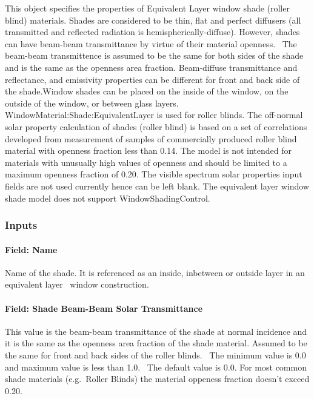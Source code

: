 This object specifies the properties of Equivalent Layer window shade (roller blind) materials. Shades are considered to be thin, flat and perfect diffusers (all transmitted and reflected radiation is hemispherically-diffuse). However, shades can have beam-beam transmittance by virtue of their material openness.~ The beam-beam transmittence is assumed to be the same for both sides of the shade and is the same as the openness area fraction. Beam-diffuse transmittance and reflectance, and emissivity properties can be different for front and back side of the shade.Window shades can be placed on the inside of the window, on the outside of the window, or between glass layers. WindowMaterial:Shade:EquivalentLayer is used for roller blinds. The off-normal solar property calculation of shades (roller blind) is based on a set of correlations developed from measurement of samples of commercially produced roller blind material with openness fraction less than 0.14. The model is not intended for materials with unusually high values of openness and should be limited to a maximum openness fraction of 0.20. The visible spectrum solar properties input fields are not used currently hence can be left blank. The equivalent layer window shade model does not support WindowShadingControl.

\subsubsection{Inputs}\label{inputs-26-002}

\paragraph{Field: Name}\label{field-name-20-003}

Name of the shade. It is referenced as an inside, inbetween or outside layer in an equivalent layer~ window construction.

\paragraph{Field: Shade Beam-Beam Solar Transmittance}\label{field-shade-beam-beam-solar-transmittance}

This value is the beam-beam transmittance of the shade at normal incidence and it is the same as the openness area fraction of the shade material. Assumed to be the same for front and back sides of the roller blinds.~ The minimum value is 0.0 and maximum value is less than 1.0.~ The default value is 0.0. For most common shade materials (e.g.~Roller Blinds) the material oppeness fraction doesn't exceed 0.20.


